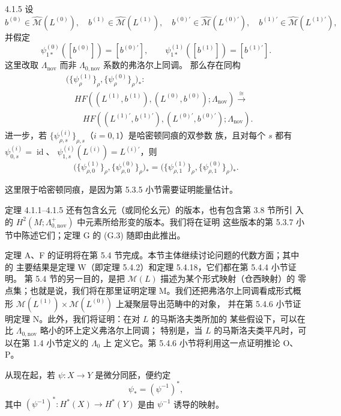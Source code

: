 \begin{theorem}{4.1.5}\label{thm:4-1-5}
设
\[
  b^{(0)}\in\widehat{\mathcal M}(L^{(0)}),\quad
  b^{(1)}\in\widehat{\mathcal M}(L^{(1)}),\quad
  b^{(0)'}\in\widehat{\mathcal M}(L^{(0)'}),\quad
  b^{(1)'}\in\widehat{\mathcal M}(L^{(1)'}),
\]
并假定
\[
  \psi_{1*}^{(0)}([b^{(0)}])=[b^{(0)'}],\qquad
  \psi_{1*}^{(1)}([b^{(1)}])=[b^{(1)'}].
\]
这里改取 $\Lambda_{\mathrm{nov}}$ 而非 $\Lambda_{0,\mathrm{nov}}$ 系数的弗洛尔上同调。
那么存在同构
\[
  \begin{aligned}
  &\bigl(\{\psi_\rho^{(1)}\}_\rho,
         \{\psi_\rho^{(0)}\}_\rho\bigr)_*:\\[-0.25ex]
  &\quad HF((L^{(1)},b^{(1)}),(L^{(0)},b^{(0)});\Lambda_{\mathrm{nov}})
  \xrightarrow{\ \cong\ }\\[-0.25ex]
  &\qquad HF((L^{(1)'},b^{(1)'}),(L^{(0)'},b^{(0)'});\Lambda_{\mathrm{nov}}).
  \end{aligned}
\]
进一步，若 $\{\psi_{\rho,s}^{(i)}\}_{\rho,s}$（$i=0,1$）是哈密顿同痕的双参数
族，且对每个 $s$ 都有
$\psi_{0,s}^{(i)}=\operatorname{id}$、
$\psi_{1,s}^{(i)}(L^{(i)})=L^{(i)'}$，则
\[
  \bigl(\{\psi_{\rho,0}^{(1)}\}_\rho,
        \{\psi_{\rho,0}^{(0)}\}_\rho\bigr)_*
  =
  \bigl(\{\psi_{\rho,1}^{(1)}\}_\rho,
        \{\psi_{\rho,1}^{(0)}\}_\rho\bigr)_*.
\]
\end{theorem}

这里限于哈密顿同痕，是因为第 5.3.5 小节需要证明能量估计。

定理 4.1.1--4.1.5 还有包含幺元（或同伦幺元）的版本，也有包含第 3.8 节所引
入的 $H^2(M;\Lambda^+_{0,\mathrm{nov}})$ 中元素所给形变的版本。我们将在证明
这些版本的第 5.3.7 小节中陈述它们；定理 G 的 (G.3) 随即由此推出。

定理 A、F 的证明将在第 5.4 节完成。本节主体继续讨论问题的代数方面；其中的
主要结果是定理 W（即定理 5.4.2）和定理 5.4.18，它们都在第 5.4.4 小节证明。
第 5.4 节的另一目的，是把 $\mathcal M(L)$ 描述为某个形式映射（仓西映射）的
零点集；也就是说，我们将在那里证明定理 M。我们还把弗洛尔上同调看成形式概
形 $\mathcal M(L^{(1)})\times\mathcal M(L^{(0)})$ 上凝聚层导出范畴中的对象，
并在第 5.4.6 小节证明定理 N。此外，我们将证明：在对 $L$ 的马斯洛夫类所加的
某些假设下，可以在比 $\Lambda_{0,\mathrm{nov}}$ 略小的环上定义弗洛尔上同调；
特别是，当 $L$ 的马斯洛夫类平凡时，可以在第 1.4 小节定义的 $\Lambda_0$ 上
定义它。第 5.4.6 小节将利用这一点证明推论 O、P。

从现在起，若 $\psi:X\to Y$ 是微分同胚，便约定
\[
  \psi_*=(\psi^{-1})^*,
\]
其中 $(\psi^{-1})^*:H^*(X)\to H^*(Y)$ 是由 $\psi^{-1}$ 诱导的映射。
